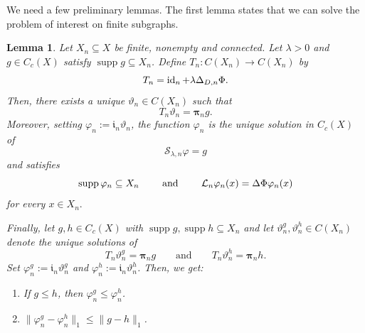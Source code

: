 \documentclass[letterpaper]{article}
\newtheorem{lemma}{Lemma}[section]
\theoremstyle{definition}
\theoremstyle{named}
\numberwithin{equation}{section}
\newcommand{\Lmin}{\mathcal{L}_{n}}
\newcommand{\Deltadir}[1][]{\Delta_{D\ifx&#1&\else,#1\fi}}
\begin{document}
We need a few  preliminary lemmas. The first lemma states that
we can solve the problem of interest on finite subgraphs.
\begin{lemma}\label{lem:finite-resolvent}
Let $X_n\subseteq X$ be finite, nonempty and connected. Let $\lambda>0$ and
$g\in C_c(X)$ satisfy $\operatorname{supp}g\subseteq X_n$.
{ Define} $T_n\colon C(X_n)\to C(X_n)$ by
\[
T_n =\operatorname{id}_n+\lambda\Deltadir[n]\Phi.
\]
Then, there exists a unique $\vartheta_n\in C(X_n)$ such that
\[
T_n\vartheta_n=\boldsymbol{\pi}_n g.
\]
Moreover, setting $\varphi_n:=\boldsymbol{\mathfrak i}_n\vartheta_n$, the function $\varphi_n$ is the unique  solution in $C_c(X)$ of
\[
\mathcal{S}_{\lambda,n}\varphi=g
\]
and satisfies
\begin{equation}\label{eq:properties_finite-resolvent-solution}
\operatorname{supp}\varphi_n\subseteq X_n
\qquad \textup{ and } \qquad
\Lmin\varphi_n(x)=\Delta\Phi\varphi_n(x)
\end{equation}
for every $x\in X_n.$

Finally, let $g,h\in C_c(X)$ with $\operatorname{supp}g,\operatorname{supp}h\subseteq X_n$ and let
$\vartheta_n^g,\vartheta_n^h\in C(X_n)$ denote the unique solutions of
\[
T_n\vartheta_n^g=\boldsymbol{\pi}_n g\qquad \text{and} \qquad
T_n\vartheta_n^h=\boldsymbol{\pi}_n h.
\]
Set $\varphi_n^g:=\boldsymbol{\mathfrak i}_n\vartheta_n^g$ and $\varphi_n^h:=\boldsymbol{\mathfrak i}_n\vartheta_n^h$. Then, we get:
\begin{enumerate}[label=\textup{(\alph*)},leftmargin=2.4em]
\item If $g\le h$, then $\varphi_n^g\le \varphi_n^h$.

\item $\|\varphi_n^g-\varphi_n^h\|_1 \leq \|g-h\|_1$.
\end{enumerate}
\end{lemma}
\end{document}
